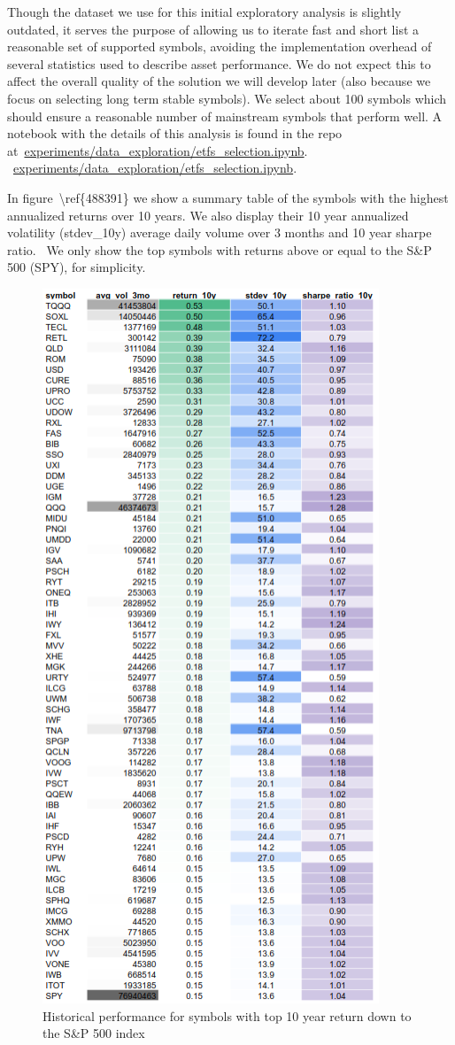 \documentclass[10pt]{article}
\begin{document}
Though the dataset we use for this initial exploratory analysis is
slightly outdated, it serves the purpose of allowing us to iterate fast
and short list a reasonable set of supported symbols, avoiding the
implementation overhead of several statistics used to describe asset
performance. We do not expect this to affect the overall quality of the
solution we will develop later (also because we focus on selecting long
term stable symbols). We select about 100 symbols which should ensure a
reasonable number of mainstream symbols that perform well. A notebook
with the details of this analysis is found in the repo
at~\href{https://github.com/marcoopsampaio/aws_ml_eng_project_stock_prediction/blob/main/experiments/data_exploration/etfs_selection.ipynb}{experiments/data\_exploration/etfs\_selection.ipynb}.~
~\href{https://github.com/marcoopsampaio/aws_ml_eng_project_stock_prediction/blob/main/experiments/data_exploration/etfs_selection.ipynb}{experiments/data\_exploration/etfs\_selection.ipynb}.~

In figure~{\textbackslash ref\{488391\}} we show a summary table of the
symbols with the highest annualized returns over 10 years. We also
display their 10 year annualized volatility (stdev\_10y) average daily
volume over 3 months and 10 year sharpe ratio.~ We only show the top
symbols with returns above or equal to the S\&P 500 (SPY), for
simplicity.
\begin{figure}[H]
\begin{center}
\includegraphics[width=0.56\columnwidth]{figures/screenshot/screenshot}
\caption{{Historical performance for symbols with top 10 year return down to the
S\&P 500 index~
{\label{488391}}%
}}
\end{center}
\end{figure}
\end{document}
